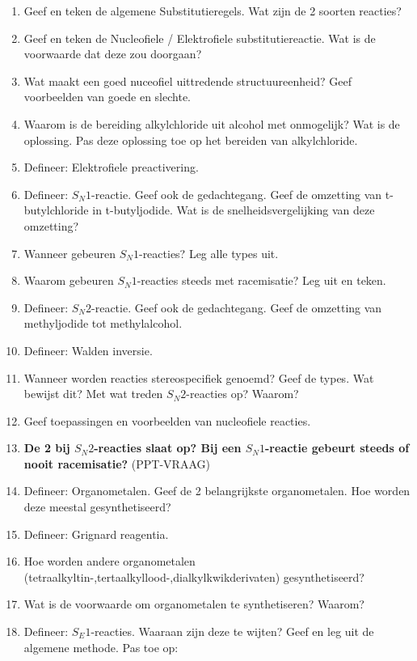 \documentclass[a4paper,12pt]{article}
\begin{document}
    \begin{enumerate}
        \item Geef en teken de algemene Substitutieregels. Wat zijn de 2 soorten reacties?
        \item Geef en teken de Nucleofiele / Elektrofiele substitutiereactie. Wat is de voorwaarde dat deze zou doorgaan?
        \item Wat maakt een goed nuceofiel uittredende structuureenheid? Geef voorbeelden van goede en slechte.
        \item Waarom is de bereiding alkylchloride uit alcohol met  onmogelijk? Wat is de oplossing. Pas deze oplossing toe op het bereiden van alkylchloride.
        \item Defineer: Elektrofiele preactivering.
        \item Defineer: $S_N1$-reactie. Geef ook de gedachtegang. Geef de omzetting van t-butylchloride in t-butyljodide. Wat is de snelheidsvergelijking van deze omzetting?
        \item Wanneer gebeuren $S_N1$-reacties? Leg alle types uit.
        \item Waarom gebeuren $S_N1$-reacties steeds met racemisatie? Leg uit en teken.
        \item Defineer: $S_N2$-reactie. Geef ook de gedachtegang. Geef de omzetting van methyljodide tot methylalcohol.
        \item Defineer: Walden inversie.
        \item Wanneer worden reacties stereospecifiek genoemd? Geef de types. Wat bewijst dit? Met wat treden $S_N2$-reacties op? Waarom?
        \item Geef toepassingen en voorbeelden van nucleofiele reacties.
        \item \textbf{De 2 bij $S_N2$-reacties slaat op? Bij een $S_N1$-reactie gebeurt steeds of nooit racemisatie?} (PPT-VRAAG)
        \item Defineer: Organometalen. Geef de 2 belangrijkste organometalen. Hoe worden deze meestal gesynthetiseerd? 
        \item Defineer: Grignard reagentia. 
        \item Hoe worden andere organometalen (tetraalkyltin-,tertaalkyllood-,dialkylkwikderivaten) gesynthetiseerd?
        \item Wat is de voorwaarde om organometalen te synthetiseren? Waarom?
        \item Defineer: $S_E1$-reacties. Waaraan zijn deze te wijten? Geef en leg uit de algemene methode. Pas toe op:

\end{enumerate}
\end{document}
